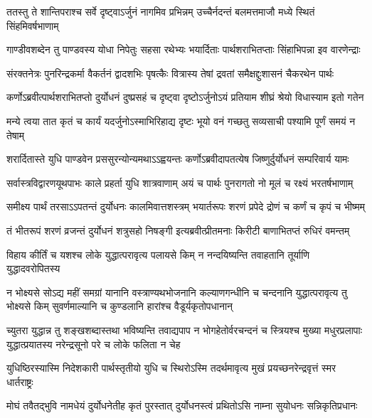 \twolineshloka
{ततस्तु ते शान्तिपराश्च सर्वे दृष्ट्वाऽर्जुनं नागमिव प्रभिन्नम्}
{उच्चैर्नदन्तं बलमत्तमाजौ मध्ये स्थितं सिंहमिवर्षभाणाम्}


\twolineshloka
{गाण्डीवशब्देन तु पाण्डवस्य योधा निपेतुः सहसा रथेभ्यः}
{भयार्दिताः पार्थशराभितप्ताः सिंहाभिपन्ना इव वारणेन्द्राः}


\twolineshloka
{संरक्तनेत्रः पुनरिन्द्रकर्मा वैकर्तनं द्वादशभिः पृषत्कैः}
{वित्रास्य तेषां द्रवतां समैक्षद्दुःशासनं चैकरथेन पार्थः}


\twolineshloka
{कर्णोऽब्रवीत्पार्थशराभितप्तो दुर्योधनं दुष्प्रसहं च दृष्ट्वा}
{दृष्टोऽर्जुनोऽयं प्रतियाम शीघ्रं श्रेयो विधास्याम इतो गतेन}


\twolineshloka
{मन्ये त्वया तात कृतं च कार्यं यदर्जुनोऽस्माभिरिहाद्य दृष्टः}
{भूयो वनं गच्छतु सव्यसाची पश्यामि पूर्णं समयं न तेषाम्}



\twolineshloka
{शरार्दितास्ते युधि पाण्डवेन प्रससुरन्योन्यमथाऽऽह्वयन्तः}
{कर्णोऽब्रवीदापतत्येष जिष्णुर्दुर्योधनं सम्परिवार्य यामः}


\twolineshloka
{सर्वास्त्रविद्वारणयूथपाभः काले प्रहर्ता युधि शात्रवाणाम्}
{अयं च पार्थः पुनरागतो नो मूलं च रक्ष्यं भरतर्षभाणाम्}


\twolineshloka
{समीक्ष्य पार्थं तरसाऽऽपतन्तं दुर्योधनः कालमिवात्तशस्त्रम्}
{भयार्तरूपः शरणं प्रपेदे द्रोणं च कर्णं च कृपं च भीष्मम्}


\twolineshloka
{तं भीतरूपं शरणं व्रजन्तं दुर्योधनं शत्रुसहो निषङ्गी}
{इत्यब्रवीत्प्रीतमनाः किरीटी बाणाभितप्तं रुधिरं वमन्तम्}


\twolineshloka
{विहाय कीर्तिं च यशश्च लोके युद्धात्परावृत्य पलायसे किम्}
{न नन्दयिष्यन्ति तवाहतानि तूर्याणि युद्धादवरोपितस्य}


\threelineshloka
{न भोक्ष्यसे सोऽद्य महीं समग्रां यानानि वस्त्राण्यथभोजनानि}
{कल्याणगन्धीनि च चन्दनानि युद्धात्परावृत्य तु भोक्ष्यसे किम्}
{सुवर्णमाल्यानि च कुण्डलानि हारांश्च वैडूर्यकृतोपधानान्}


\threelineshloka
{च्युतरा युद्धान्न तु शङ्खशब्दास्तथा भविष्यन्ति तवाद्यपाप}
{न भोगहेतोर्वरचन्दनं च स्त्रियश्च मुख्या मधुरप्रलापाः}
{युद्धात्प्रयातस्य नरेन्द्रसूनो परे च लोके फलिता न चेह}


\twolineshloka
{युधिष्ठिरस्यास्मि निदेशकारी पार्थस्तृतीयो युधि च स्थिरोऽस्मि}
{तदर्थमावृत्य मुखं प्रयच्छनरेन्द्रवृत्तं स्मर धार्तराष्ट्रः}


\twolineshloka
{मोघं तवैतद्भुवि नामधेयं दुर्योधनेतीह कृतं पुरस्तात्}
{दुर्योधनस्त्वं प्रथितोऽसि नाम्ना सुयोधनः सन्निकृतिप्रधानः}



